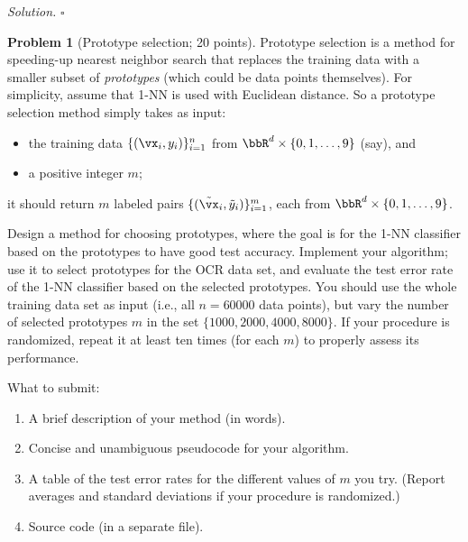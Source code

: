 \documentclass[11pt]{article}
\theoremstyle{definition}
\newtheorem{problem}{Problem}
\newenvironment{solution}{\noindent\emph{Solution.}}{\hfill$\square$}
\begin{document}
\begin{solution}
\end{solution}

\newpage


\begin{problem}[Prototype selection; 20 points]
  Prototype selection is a method for speeding-up nearest neighbor search that
  replaces the training data with a smaller subset of \emph{prototypes} (which
  could be data points themselves).
  For simplicity, assume that 1-NN is used with Euclidean distance.
  So a prototype selection method simply takes as input:
  \begin{itemize}
    \item
      the training data $\{ (\vx_i,y_i) \}_{i=1}^n$ from $\bbR^d \times
      \{0,1,\dotsc,9\}$ (say), and

    \item
      a positive integer $m$;

  \end{itemize}
  it should return $m$ labeled pairs $\{(\tilde\vx_i,\tilde y_i)\}_{i=1}^m$,
  each from $\bbR^d \times \{0,1,\dotsc,9\}$.

  Design a method for choosing prototypes, where the goal is for the 1-NN
  classifier based on the prototypes to have good test accuracy.
  Implement your algorithm; use it to select prototypes for the OCR data
  set, and evaluate the test error rate of the 1-NN classifier based on the
  selected prototypes.
  You should use the whole training data set as input (i.e., all $n=60000$ data
  points), but vary the number of selected prototypes $m$ in the set $\{ 1000,
  2000, 4000, 8000 \}$.
  If your procedure is randomized, repeat it at least ten times (for each $m$)
  to properly assess its performance.

  What to submit:
  \begin{enumerate}
    \item
      A brief description of your method (in words).

    \item
      Concise and unambiguous pseudocode for your algorithm.

    \item
      A table of the test error rates for the different values of $m$ you try.
      (Report averages and standard deviations if your procedure is randomized.)

    \item
      Source code (in a separate file).

  \end{enumerate}

\end{problem}
\end{document}
